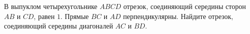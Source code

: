 \begin{ex}
	\begin{condition}
		В выпуклом четырехугольнике \( ABCD  \) отрезок, соединяющий середины сторон \( AB  \) и \( CD \), равен \( 1 \). Прямые \( BC  \) и \( AD \) перпендикулярны. Найдите отрезок, соединяющий середины диагоналей \( AC  \) и \( BD \).
	\end{condition}
\end{ex}